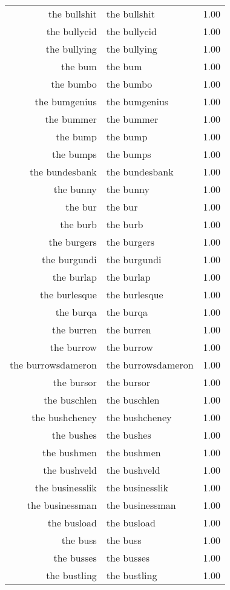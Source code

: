 \begin{table}[ht]
\begin{tabular}{rlr}
  the bullshit & the bullshit & 1.00 \\ 
  the bullycid & the bullycid & 1.00 \\ 
  the bullying & the bullying & 1.00 \\ 
  the bum & the bum & 1.00 \\ 
  the bumbo & the bumbo & 1.00 \\ 
  the bumgenius & the bumgenius & 1.00 \\ 
  the bummer & the bummer & 1.00 \\ 
  the bump & the bump & 1.00 \\ 
  the bumps & the bumps & 1.00 \\ 
  the bundesbank & the bundesbank & 1.00 \\ 
  the bunny & the bunny & 1.00 \\ 
  the bur & the bur & 1.00 \\ 
  the burb & the burb & 1.00 \\ 
  the burgers & the burgers & 1.00 \\ 
  the burgundi & the burgundi & 1.00 \\ 
  the burlap & the burlap & 1.00 \\ 
  the burlesque & the burlesque & 1.00 \\ 
  the burqa & the burqa & 1.00 \\ 
  the burren & the burren & 1.00 \\ 
  the burrow & the burrow & 1.00 \\ 
  the burrowsdameron & the burrowsdameron & 1.00 \\ 
  the bursor & the bursor & 1.00 \\ 
  the buschlen & the buschlen & 1.00 \\ 
  the bushcheney & the bushcheney & 1.00 \\ 
  the bushes & the bushes & 1.00 \\ 
  the bushmen & the bushmen & 1.00 \\ 
  the bushveld & the bushveld & 1.00 \\ 
  the businesslik & the businesslik & 1.00 \\ 
  the businessman & the businessman & 1.00 \\ 
  the busload & the busload & 1.00 \\ 
  the buss & the buss & 1.00 \\ 
  the busses & the busses & 1.00 \\ 
  the bustling & the bustling & 1.00 \\ 

\end{tabular}
\end{table}
